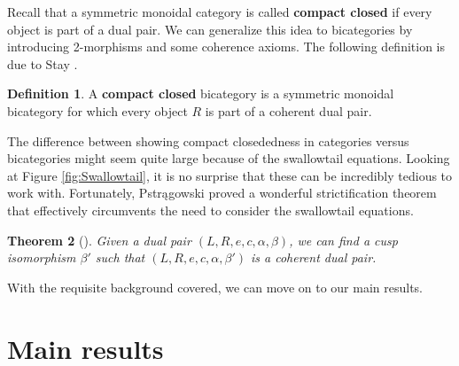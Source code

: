 \documentclass{tac}
\newtheorem{thm}{Theorem}[section]
\theoremstyle{remark}
\theoremstyle{definition}
\newtheorem{defn}[thm]{Definition}
\begin{document}
Recall that a symmetric monoidal category is called 
\textbf{compact closed} if every object is part of a dual pair. 
We can generalize this idea to bicategories by 
introducing 2-morphisms and some coherence axioms. 
The following definition is due to Stay 
	\cite{Stay}.

\begin{defn}
	\label{def:CompClosdBicat}
	A \textbf{compact closed} bicategory is a symmetric monoidal bicategory for which
	every object $R$ 
	is part of a coherent dual pair. 
\end{defn}

The difference between showing compact closededness 
in categories versus bicategories might seem quite large 
because of the swallowtail equations.  
Looking at Figure 
	\ref{fig:Swallowtail}, 
it is no surprise that these can be incredibly tedious to work with.  
Fortunately, Pstr\k{a}gowski \cite{Piotr} proved a wonderful strictification theorem 
that effectively circumvents the need to consider the swallowtail equations.  

\begin{thm}[{\cite[p.~22]{Piotr}}]
	\label{thm:StrictingDualPairs}
	Given a dual pair $(L,R,e,c,\alpha,\beta)$, 
	we can find a cusp isomorphism $\beta'$ such that
	 $(L,R,e,c,\alpha,\beta')$ is a coherent dual pair.
\end{thm}

With the requisite background covered,
we can move on to our main results.

\section{Main results} %
\label{sec:SpansCospans}
\end{document}
